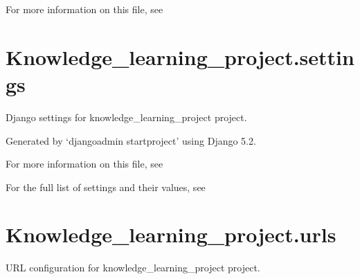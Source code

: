 \documentclass[letterpaper,10pt,english]{sphinxmanual}
\begin{document}
\sphinxAtStartPar
For more information on this file, see


\section{Knowledge\_learning\_project.settings}
\label{\detokenize{knowledge_learning_project:module-knowledge_learning_project.settings}}\label{\detokenize{knowledge_learning_project:knowledge-learning-project-settings}}
\sphinxAtStartPar
Django settings for knowledge\_learning\_project project.

\sphinxAtStartPar
Generated by ‘django\sphinxhyphen{}admin startproject’ using Django 5.2.

\sphinxAtStartPar
For more information on this file, see

\sphinxAtStartPar
For the full list of settings and their values, see


\section{Knowledge\_learning\_project.urls}
\label{\detokenize{knowledge_learning_project:module-knowledge_learning_project.urls}}\label{\detokenize{knowledge_learning_project:knowledge-learning-project-urls}}
\sphinxAtStartPar
URL configuration for knowledge\_learning\_project project.
\begin{description}
\sphinxAtStartPar
{}

\end{description}
\end{document}
